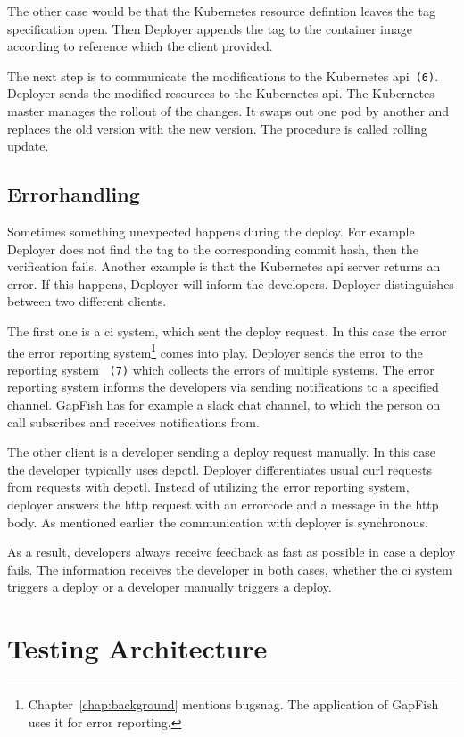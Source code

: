 The other case would be that the Kubernetes resource defintion leaves the tag
specification open. Then Deployer appends the tag to the container image according to
reference which the client provided.

The next step is to communicate the modifications to the Kubernetes
api~\texttt{(6)}. Deployer sends the modified resources to the Kubernetes api. The
Kubernetes master manages the rollout of the changes. It swaps out one pod by another and
replaces the old version with the new version. The procedure is called rolling update.

\subsection{Errorhandling}

Sometimes something unexpected happens during the deploy. For example Deployer does not
find the tag to the corresponding commit hash, then the verification fails. Another
example is that the Kubernetes api server returns an error. If this happens, Deployer will
inform the developers. Deployer distinguishes between two different clients.

The first one is a \gls{ci} system, which sent the deploy request. In this case the error
the error reporting system\footnote{Chapter~\ref{chap:background} mentions bugsnag. The
  application of GapFish uses it for error reporting.} comes into play. Deployer sends the
error to the reporting system ~\texttt{(7)} which collects the errors of multiple
systems. The error reporting system informs the developers via sending notifications to a
specified channel. GapFish has for example a slack chat channel, to which the person on
call subscribes and receives notifications from.

The other client is a developer sending a deploy request manually. In this case the
developer typically uses depctl. Deployer differentiates usual curl requests from requests
with depctl. Instead of utilizing the error reporting system, deployer answers the http
request with an errorcode and a message in the http body. As mentioned earlier the
communication with deployer is synchronous.

As a result, developers always receive feedback as fast as possible in case a deploy
fails. The information receives the developer in both cases, whether the \gls{ci} system
triggers a deploy or a developer manually triggers a deploy.

\section{Testing Architecture}
\label{test_architecture}

